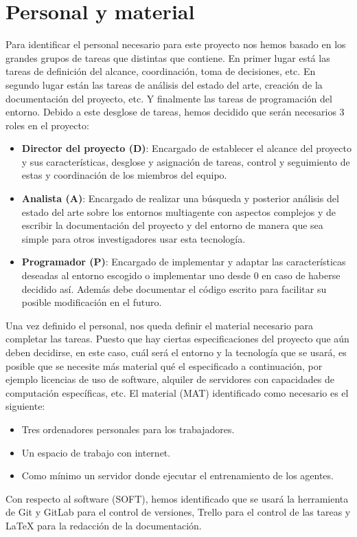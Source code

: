 \chapter{Personal y material}
Para identificar el personal necesario para este proyecto nos hemos basado en los grandes grupos de tareas que distintas que contiene. En primer lugar está las tareas de definición del alcance, coordinación, toma de decisiones, etc. En segundo lugar están las tareas de análisis del estado del arte, creación de la documentación del proyecto, etc. Y finalmente las tareas de programación del entorno. Debido a este desglose de tareas, hemos decidido que serán necesarios 3 roles en el proyecto:
\begin{itemize}
    \item \textbf{Director del proyecto (D)}: Encargado de establecer el alcance del proyecto y sus características, desglose y asignación de tareas, control y seguimiento de estas y coordinación de los miembros del equipo.
    \item \textbf{Analista (A)}: Encargado de realizar una búsqueda y posterior análisis del estado del arte sobre los entornos multiagente con aspectos complejos y de escribir la documentación del proyecto y del entorno de manera que sea simple para otros investigadores usar esta tecnología.
    \item \textbf{Programador (P)}: Encargado de implementar y adaptar las características deseadas al entorno escogido o implementar uno desde 0 en caso de haberse decidido así. Además debe documentar el código escrito para facilitar su posible modificación en el futuro.  
\end{itemize}
 
 Una vez definido el personal, nos queda definir el material necesario para completar las tareas. Puesto que hay ciertas especificaciones del proyecto que aún deben decidirse, en este caso, cuál será el entorno y la tecnología que se usará, es posible que se necesite más material qué el especificado a continuación, por ejemplo licencias de uso de software, alquiler de servidores con capacidades de computación específicas, etc.
 El material (MAT) identificado como necesario es el siguiente:
 \begin{itemize}
     \item Tres ordenadores personales para los trabajadores.
     \item Un espacio de trabajo con internet.
     \item Como mínimo un servidor donde ejecutar el entrenamiento de los agentes.
 \end{itemize}
 
 Con respecto al software (SOFT), hemos identificado que se usará la herramienta de Git y GitLab para el control de versiones, Trello para el control de las tareas y LaTeX para la redacción de la documentación.